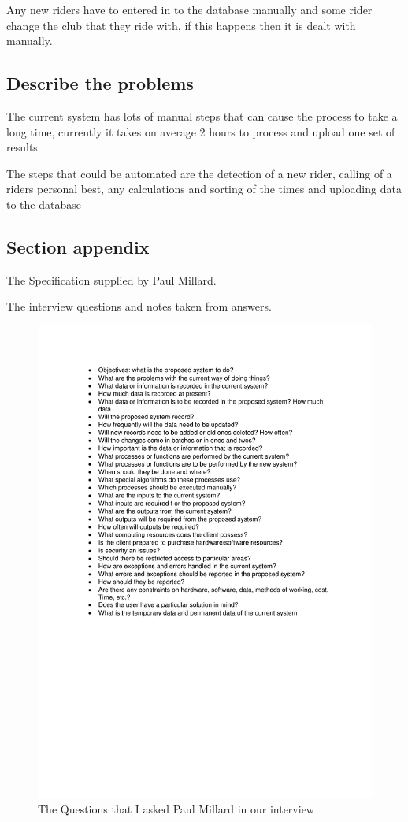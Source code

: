 Any new riders have to entered in to the database manually and some rider change the club that they ride with, if this happens then it is dealt with manually.
\subsection{Describe the problems}
The current system has lots of manual steps that can cause the process to take a long time, currently it takes on average 2 hours to process and upload one set of results

The steps that could be automated are the detection of a new rider, calling of a riders personal best, any calculations and sorting of the times and uploading data to the database
\subsection{Section appendix}

The Specification supplied by Paul Millard.


The interview questions and notes taken from answers.

\begin{figure}[H]
    \includegraphics[width=\textwidth]{./Questions.pdf}
    \caption{The Questions that I asked Paul Millard in our interview} \label{fig:Questions}
\end{figure}

